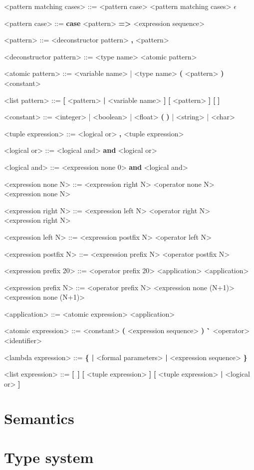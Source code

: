 \documentclass[12pt]{article}
\begin{document}
\begin{grammar}
<pattern matching cases> ::= <pattern case> <pattern matching cases>
    \alt $\epsilon$

<pattern case> ::= \textbf{case} <pattern> \textbf{=>} <expression sequence>

<pattern> ::= <deconstructor pattern>
     \textbf{,} <pattern>

<deconstructor pattern> ::= <type name> <atomic pattern>

<atomic pattern> ::= <variable name> | <type name>
    \alt \textbf{(} <pattern> \textbf{)}
    \alt <constant>

<list pattern> ::= \textbf{[} <pattern> \textbf{|} <variable name> \textbf{]}
    \alt \textbf{[} <pattern> \textbf{]}
    \alt \textbf{[\,\,]}

<constant> ::= <integer> | <boolean> | <float> 
    \alt \textbf{(\,\,)} | <string> | <char>

<tuple expression> ::= <logical or> \textbf{,} <tuple expression>

<logical or> ::= <logical and> \textbf{and} <logical or>

<logical and> ::= <expression none 0> \textbf {and} <logical and>

<expression none N> ::= <expression right N> <operator none N>\\ <expression none N>

<expression right N> ::= <expression left N> <operator right N>\\ <expression right N>

<expression left N> ::= <expression postfix N> <operator left N>\\<expression left N>

<expression postfix N> ::= <expression prefix N> <operator postfix N>

<expression prefix 20> ::= <operator prefix 20> <application>
    \alt <application>

<expression prefix N> ::= <operator prefix N> <expression none (N+1)>
    \alt <expression none (N+1)>

<application> ::= <atomic expression> <application>

<atomic expression> ::= <constant>
    \alt \textbf{(} <expression sequence> \textbf{)}
    \alt \textbf{\`} <operator>
    \alt <identifier>

<lambda expression> ::= \textbf{\{ |} <formal parameters> \textbf{|} <expression sequence> \textbf{\}}

<list expression> ::= \textbf{[} \,\textbf{]}
    \alt \textbf{[} <tuple expression> \textbf{]}
    \alt \textbf{[} <tuple expression> \textbf{|} <logical or> \textbf{]}

\end{grammar}

\section{Semantics}

\section{Type system}
\end{document}
